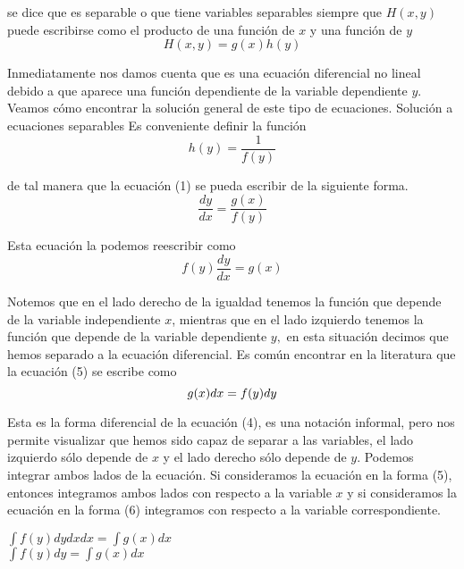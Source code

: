 \documentclass[l etterpaper,11pt]{article}
\begin{document}
se dice que es separable o que tiene variables separables siempre que $ H(x,y)$  puede escribirse como el producto de una función de $ x $ y una función de $ y $
\begin{equation}
H(x,y)=g(x)h(y)
\end{equation}

Inmediatamente nos damos cuenta que es una ecuación diferencial no lineal debido a que aparece una función dependiente de la variable dependiente $ y.$
Veamos cómo encontrar la solución general de este tipo de ecuaciones.
Solución a ecuaciones separables
Es conveniente definir la función
\begin{equation}
h(y)=\frac{1}{f(y)}
\end{equation}

de tal manera que la ecuación (1) se pueda escribir de la siguiente forma.
\begin{equation}
\frac{dy}{dx}=\frac{g(x)}{f(y)}
\end{equation}

Esta ecuación la podemos reescribir como
\begin{equation}
f(y)\frac{dy}{dx}=g(x)
\end{equation}

Notemos que en el lado derecho de la igualdad tenemos la función que depende de la variable independiente $ x $, mientras que en el lado izquierdo tenemos la función que depende de la variable dependiente $ y, $ en esta situación decimos que hemos separado a la ecuación diferencial.
Es común encontrar en la literatura que la ecuación (5) se escribe como
\begin{equation}
g(x)dx=f(y)dy\\
\end{equation}

Esta es la forma diferencial de la ecuación (4), es una notación informal, pero nos permite visualizar que hemos sido capaz de separar a las variables, el lado izquierdo sólo depende de $x$ y el lado derecho sólo depende de $ y $.
Podemos integrar ambos lados de la ecuación. Si consideramos la ecuación en la forma (5), entonces integramos ambos lados con respecto a la variable $x$ y si consideramos la ecuación en la forma (6) integramos con respecto a la variable correspondiente.
\begin {center}

$\int f(y)dydxdx=\int g(x)dx$\\
$\int f(y)dy=\int g(x)dx$\\
\end {center}
\end{document}
